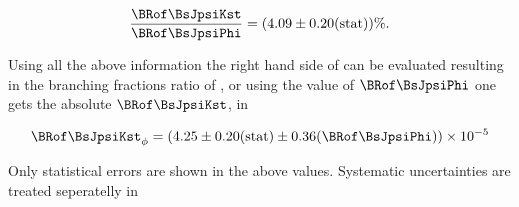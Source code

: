 \begin{equation}
\frac{\BRof\BsJpsiKst}{\BRof\BsJpsiPhi} = (4.09 \pm 0.20 ({\rm stat}) )\% .\\
\label{norm_jpsiPhi_result}
\end{equation}

\noindent Using all the above information the right hand side of  can be evaluated resulting in
the branching fractions ratio of , or using the value of $\BRof\BsJpsiPhi$
one gets the absolute $\BRof\BsJpsiKst$, in 

\begin{equation}
\label{Br_JpsiPhi}
\BRof\BsJpsiKst_{\phi} = (4.25 \pm 0.20  \text{(stat)} \pm 0.36 (\BRof\BsJpsiPhi))\times 10^{-5}
\end{equation}

\noindent Only statistical errors are shown in the above values. Systematic uncertainties are treated seperatelly in 
